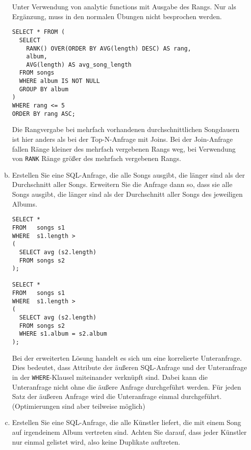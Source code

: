 \begin{enumerate}[a)]
\cprotEnv
	\begin{note}
	Unter Verwendung von analytic functions mit Ausgabe des Rangs.
	Nur als Ergänzung, muss in den normalen Übungen nicht besprochen werden.

	\begin{lstlisting}
SELECT * FROM (
  SELECT
    RANK() OVER(ORDER BY AVG(length) DESC) AS rang,
    album,
    AVG(length) AS avg_song_length
  FROM songs
  WHERE album IS NOT NULL
  GROUP BY album
)
WHERE rang <= 5
ORDER BY rang ASC;
	\end{lstlisting}

	Die Rangvergabe bei mehrfach vorhandenen durchschnittlichen Songdauern ist hier anders als bei der Top-N-Anfrage mit Joins.
	Bei der Join-Anfrage fallen Ränge kleiner des mehrfach vergebenen Rangs weg, bei Verwendung von \texttt{RANK} Ränge größer des mehrfach vergebenen Rangs.

	\end{note}


	\item Erstellen Sie eine SQL-Anfrage, die alle Songs ausgibt, die länger sind als der Durchschnitt aller Songs.
	Erweitern Sie die Anfrage dann so, dass sie alle Songs ausgibt, die länger sind als der Durchschnitt aller Songs des jeweiligen Albums.

\cprotEnv
	\begin{solution}
	\begin{lstlisting}
SELECT *
FROM   songs s1
WHERE  s1.length >
(
  SELECT avg (s2.length)
  FROM songs s2
);

SELECT *
FROM   songs s1
WHERE  s1.length >
(
  SELECT avg (s2.length)
  FROM songs s2
  WHERE s1.album = s2.album
);
	\end{lstlisting}
Bei der erweiterten Lösung handelt es sich um eine korrelierte Unteranfrage.
Dies bedeutet, dass Attribute der äußeren SQL-Anfrage und der Unteranfrage in der \texttt{WHERE}-Klausel miteinander verknüpft sind.
Dabei kann die Unteranfrage nicht ohne die äußere Anfrage durchgeführt werden.
Für jeden Satz der äußeren Anfrage wird die Unteranfrage einmal durchgeführt. (Optimierungen sind aber teilweise möglich)
	\end{solution}

	\item Erstellen \deepen Sie eine SQL-Anfrage, die alle Künstler liefert, die mit einem Song auf irgendeinem Album vertreten sind.
	Achten Sie darauf, dass jeder Künstler nur einmal gelistet wird, also keine Duplikate auftreten.


\end{enumerate}
